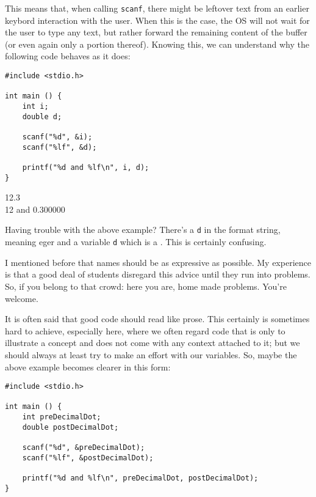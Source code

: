 This means that, when calling \texttt{scanf}, there might be leftover text from an earlier keybord interaction with the user. When this is the case, the OS will not wait for the user to type any text, but rather forward the remaining content of the buffer (or even again only a portion thereof). Knowing this, we can understand why the following code behaves as it does:

\begin{tcbraster}[raster columns=2,
                  raster equal height,
                  nobeforeafter,
                  raster column skip=0.2cm]
\begin{codebox}[keyboardBuffer.c]
\begin{verbatim}
#include <stdio.h>

int main () {
    int i;
    double d;

    scanf("%d", &i);
    scanf("%lf", &d);

    printf("%d and %lf\n", i, d);
}
\end{verbatim}
\end{codebox}
%
\begin{cmdbox}
12.3 \\
12 and 0.300000
\end{cmdbox}
\end{tcbraster}

\begin{hintbox}
Having trouble with the above example? There's a \texttt{d} in the format string, meaning eger and a variable \texttt{d} which is a . This is certainly confusing.

I mentioned before that names should be as expressive as possible. My experience is that a good deal of students disregard this advice until they run into problems. So, if you belong to that crowd: here you are, home made problems. You're welcome.

It is often said that good code should read like prose. This certainly is sometimes hard to achieve, especially here, where we often regard code that is only to illustrate a concept and does not come with any context attached to it; but we should always at least try to make an effort with our variables. So, maybe the above example becomes clearer in this form:

\begin{codebox}[keyboardBuffer.c]
\begin{verbatim}
#include <stdio.h>

int main () {
    int preDecimalDot;
    double postDecimalDot;

    scanf("%d", &preDecimalDot);
    scanf("%lf", &postDecimalDot);

    printf("%d and %lf\n", preDecimalDot, postDecimalDot);
}
\end{verbatim}
\end{codebox}
\end{hintbox}

